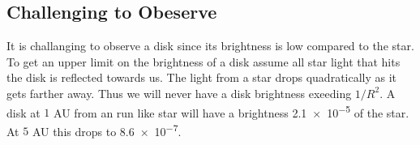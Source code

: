 
\subsection{Challenging to Obeserve}

It is challanging to observe a disk since its brightness is low compared to the star. To get an upper limit on the brightness of a disk assume all star light that hits the disk is reflected towards us. The light from a star drops quadratically as it gets farther away. Thus we will never have a disk brightness exeeding $1/R^2$. A disk at $1$ AU from an run like star will have a brightness \num{2.1e-5} of the star. At $5$ AU this drops to \num{8.6e-7}. 



